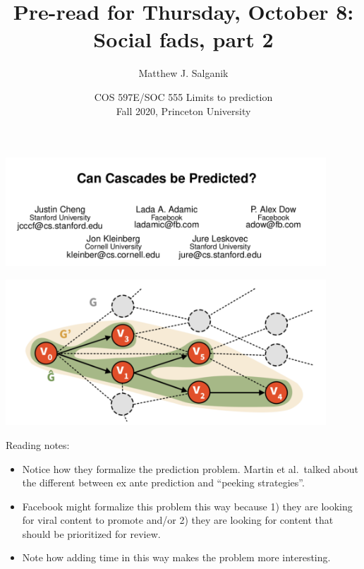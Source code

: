 \documentclass[aspectratio=169]{beamer}
\title[]{Pre-read for Thursday, October 8:\\Social fads, part 2}
\author[]{Matthew J. Salganik}
\institute[]{}
\date[]{COS 597E/SOC 555 Limits to prediction\\Fall 2020, Princeton University}
\begin{document}
\frame{\titlepage}
\begin{frame}

\begin{center}
  \includegraphics[width = 0.9\textwidth]{figures/cheng_can_2014_title}
\end{center}

\end{frame}
\begin{frame}

\begin{center}
  \includegraphics[width = 0.9\textwidth]{figures/cheng_can_2014_fig1}
\end{center}

\end{frame}
\begin{frame}

Reading notes:
\begin{itemize}
\item Notice how they formalize the prediction problem.  Martin et al.\ talked about the different between ex ante prediction and ``peeking strategies''.
\pause
\item Facebook might formalize this problem this way because 1) they are looking for viral content to promote and/or 2) they are looking for content that should be prioritized for review.
\pause
\item Note how adding time in this way makes the problem more interesting.
\end{itemize}

\end{frame}
\end{document}
